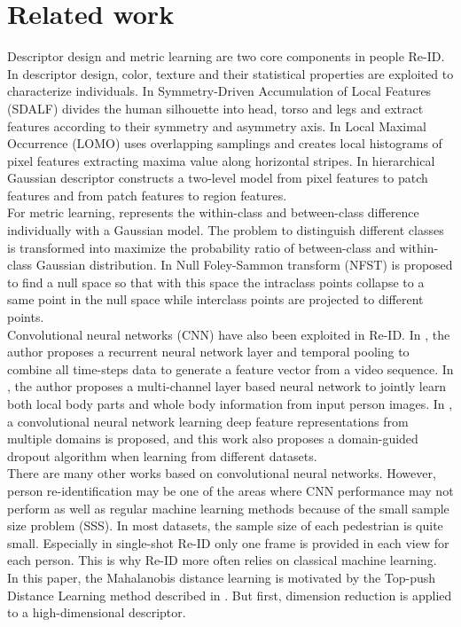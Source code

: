 \documentclass[10pt,twocolumn,letterpaper]{article}
\begin{document}
\section{Related work}
Descriptor design and metric learning are two core components in people Re-ID. In descriptor design, color, texture and their statistical properties are exploited to characterize individuals. In \cite{SDALF} Symmetry-Driven Accumulation of Local Features (SDALF) divides the human silhouette into head, torso and legs and extract features according to their symmetry and asymmetry axis. In \cite{LOMO} Local Maximal Occurrence (LOMO) uses overlapping samplings and creates local histograms of pixel features extracting maxima value along horizontal stripes. In \cite{GOG} hierarchical Gaussian descriptor constructs a two-level model from pixel features to patch features and from patch features to region features.\\
\indent For metric learning,  \cite{LOMO} represents the within-class and between-class difference individually with a Gaussian model. The problem to distinguish different classes is transformed into maximize the probability ratio of between-class and within-class Gaussian distribution. In \cite{NFST} Null Foley-Sammon transform (NFST) is proposed to find a null space so that with this space the intraclass points collapse to a same point in the null space while interclass points are projected to different points.\\
\indent Convolutional neural networks (CNN) have also been exploited in Re-ID. In \cite{RecurrentCNN}, the author proposes a recurrent neural network layer and temporal pooling to combine all time-steps data to generate a feature vector from a video sequence. In \cite{MultiCNN}, the author proposes a multi-channel layer based neural network to jointly learn both local body parts and whole body information from input person images.  In \cite{DeepfeatureCNN}, a convolutional neural network learning deep feature representations from multiple domains is proposed, and this work also proposes a domain-guided dropout algorithm when learning from different datasets. \\
\indent There are many other works based on convolutional neural networks. However, person re-identification may be one of the areas where CNN performance may not perform as well as regular machine learning methods because of the small sample size problem (SSS). In most datasets, the sample size of each pedestrian is quite small. Especially in single-shot Re-ID only one frame is provided in each view for each person. This is why Re-ID more often relies on classical machine learning.\\
\indent In this paper, the Mahalanobis distance learning is motivated by the Top-push Distance Learning method described in \cite{TDL}. But first, dimension reduction is applied to a high-dimensional descriptor.
\end{document}
